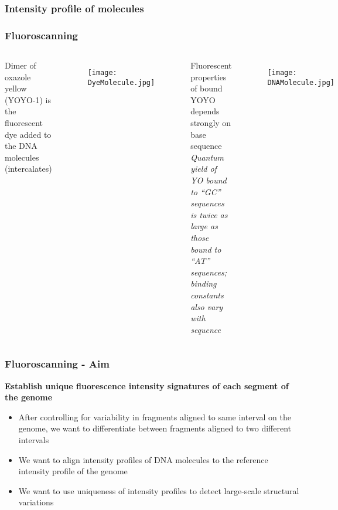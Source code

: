 \documentclass[10pt,dvipsnames,table]{beamer}
\begin{document}
\begin{frame}
\frametitle{Intensity profile of molecules}
\begin{center}
\end{center}
\end{frame}

\begin{frame}
\frametitle{Fluoroscanning}
\begin{columns}
Dimer of oxazole yellow (YOYO-1) is the fluorescent dye added to the DNA molecules (intercalates) \\
\vspace{1cm}
\begin{figure}
\texttt{[image: DyeMolecule.jpg]}
\end{figure}

\pause
{} 
Fluorescent properties of bound YOYO depends strongly on base sequence \\
\vspace{1cm}
{\emph{Quantum yield of YO bound to “GC” sequences is twice as large as those bound to “AT” sequences; binding constants also vary with sequence}}
\begin{figure}
\texttt{[image: DNAMolecule.jpg]}
\end{figure}
\end{columns}
\end{frame}

\begin{frame}
\frametitle{Fluoroscanning - Aim}
{\bf{\large Establish unique fluorescence intensity signatures of each segment of the genome}}
\begin{itemize}
\item After controlling for variability in fragments aligned to same interval on the genome, we want to differentiate between fragments aligned to two different intervals
\item We want to align intensity profiles of DNA molecules to the reference intensity profile of the genome
\item We want to use uniqueness of intensity profiles to detect large-scale structural variations
\end{itemize}
\end{frame}
\end{document}
